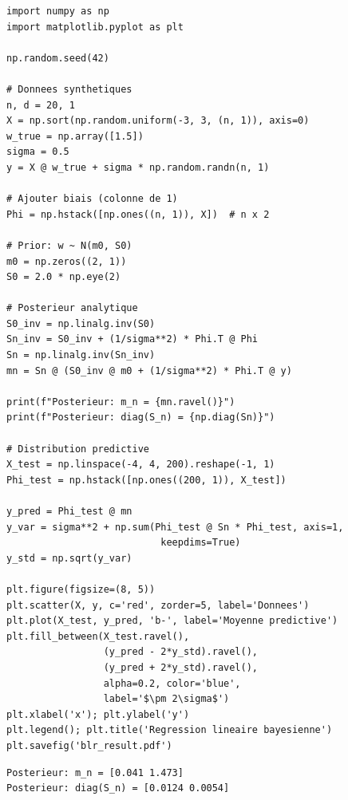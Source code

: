 \begin{codeblock}[title=\textbf{R\'egression lin\'eaire bay\'esienne from scratch}]
\begin{verbatim}
import numpy as np
import matplotlib.pyplot as plt

np.random.seed(42)

# Donnees synthetiques
n, d = 20, 1
X = np.sort(np.random.uniform(-3, 3, (n, 1)), axis=0)
w_true = np.array([1.5])
sigma = 0.5
y = X @ w_true + sigma * np.random.randn(n, 1)

# Ajouter biais (colonne de 1)
Phi = np.hstack([np.ones((n, 1)), X])  # n x 2

# Prior: w ~ N(m0, S0)
m0 = np.zeros((2, 1))
S0 = 2.0 * np.eye(2)

# Posterieur analytique
S0_inv = np.linalg.inv(S0)
Sn_inv = S0_inv + (1/sigma**2) * Phi.T @ Phi
Sn = np.linalg.inv(Sn_inv)
mn = Sn @ (S0_inv @ m0 + (1/sigma**2) * Phi.T @ y)

print(f"Posterieur: m_n = {mn.ravel()}")
print(f"Posterieur: diag(S_n) = {np.diag(Sn)}")

# Distribution predictive
X_test = np.linspace(-4, 4, 200).reshape(-1, 1)
Phi_test = np.hstack([np.ones((200, 1)), X_test])

y_pred = Phi_test @ mn
y_var = sigma**2 + np.sum(Phi_test @ Sn * Phi_test, axis=1,
                           keepdims=True)
y_std = np.sqrt(y_var)

plt.figure(figsize=(8, 5))
plt.scatter(X, y, c='red', zorder=5, label='Donnees')
plt.plot(X_test, y_pred, 'b-', label='Moyenne predictive')
plt.fill_between(X_test.ravel(),
                 (y_pred - 2*y_std).ravel(),
                 (y_pred + 2*y_std).ravel(),
                 alpha=0.2, color='blue',
                 label='$\pm 2\sigma$')
plt.xlabel('x'); plt.ylabel('y')
plt.legend(); plt.title('Regression lineaire bayesienne')
plt.savefig('blr_result.pdf')
\end{verbatim}
\end{codeblock}

\begin{codeoutput}
\begin{verbatim}
Posterieur: m_n = [0.041 1.473]
Posterieur: diag(S_n) = [0.0124 0.0054]
\end{verbatim}
\end{codeoutput}

